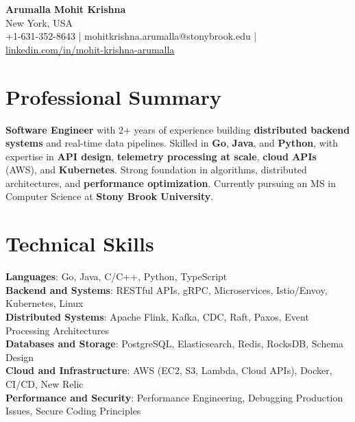 \documentclass[letterpaper,11pt]{article}
\begin{document}
\begin{center}
  {\Large \textbf{Arumalla Mohit Krishna}} \\
  New York, USA \\
  +1-631-352-8643 \enspace | \enspace mohitkrishna.arumalla@stonybrook.edu \enspace | \enspace \href{https://www.linkedin.com/in/mohit-krishna-arumalla}{linkedin.com/in/mohit-krishna-arumalla}
\end{center}

\section{Professional Summary}
  \begin{itemize}[leftmargin=0.15in, label={}]
    \small{\item{
     \textbf{Software Engineer} with 2+ years of experience building \textbf{distributed backend systems} and real-time data pipelines. Skilled in \textbf{Go}, \textbf{Java}, and \textbf{Python}, with expertise in \textbf{API design}, \textbf{telemetry processing at scale}, \textbf{cloud APIs} (AWS), and \textbf{Kubernetes}. Strong foundation in algorithms, distributed architectures, and \textbf{performance optimization}. Currently pursuing an MS in Computer Science at \textbf{Stony Brook University}.
    }}
  \end{itemize}
\vspace{-16pt}

\section{Technical Skills}
 \begin{itemize}[leftmargin=0.15in, label={}]
    \small{\item{
     \textbf{Languages}: Go, Java, C/C++, Python, TypeScript \\
     \textbf{Backend and Systems}: RESTful APIs, gRPC, Microservices, Istio/Envoy, Kubernetes, Linux \\
     \textbf{Distributed Systems}: Apache Flink, Kafka, CDC, Raft, Paxos, Event Processing Architectures \\
     \textbf{Databases and Storage}: PostgreSQL, Elasticsearch, Redis, RocksDB, Schema Design \\
     \textbf{Cloud and Infrastructure}: AWS (EC2, S3, Lambda, Cloud APIs), Docker, CI/CD, New Relic \\
     \textbf{Performance and Security}: Performance Engineering, Debugging Production Issues, Secure Coding Principles
    }}
 \end{itemize}
\vspace{-16pt}
\end{document}
